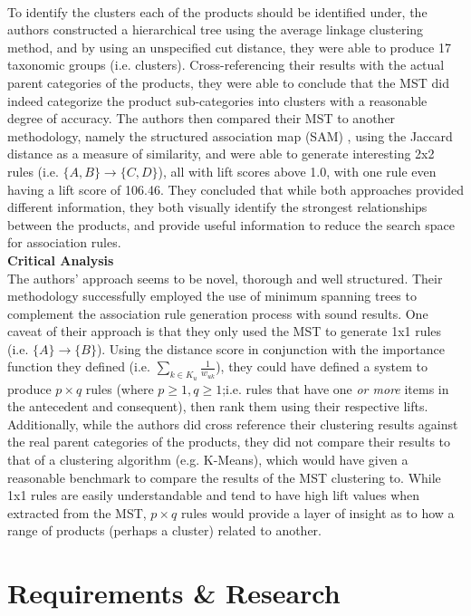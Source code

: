 \documentclass[a4paper,11pt]{article}
\newcommand{\setA}{\{A\}}
\newcommand{\setB}{\{B\}}
\newcommand{\abrule}{\setA\rightarrow\setB}
\begin{document}
\\
To identify the clusters each of the products should be identified under, the authors constructed a hierarchical tree using the average linkage clustering method, and by using an unspecified cut distance, they were able to produce 17 taxonomic groups (i.e. clusters). Cross-referencing their results with the actual parent categories of the products, they were able to conclude that the MST did indeed categorize the product sub-categories into clusters with a reasonable degree of accuracy. The authors then compared their MST to another methodology, namely the structured association map (SAM) \cite{kim}, using the Jaccard distance as a measure of similarity,  and were able to generate interesting 2x2 rules (i.e. $\{A,B\}\rightarrow\{C, D\}$), all with lift scores above 1.0, with one rule even having a lift score of 106.46. They concluded that while both approaches provided different information, they both visually identify the strongest relationships between the products, and provide useful information to reduce the search space for association rules.
\\\textbf{Critical Analysis}\\
The authors' approach seems to be novel,  thorough and well structured.  Their methodology successfully employed the use of minimum spanning trees to complement the association rule generation process with sound results.  One caveat of their approach is that they only used the MST to generate 1x1 rules (i.e. $\abrule$). Using the distance score in conjunction with the importance function they defined (i.e. $\sum\limits_{k \in K_u}^{} \frac{1}{w_{uk}}$), they could have defined a system to produce $p \times q$ rules (where $ p \geq 1, q \geq 1$;i.e. rules that have one \textit{or more} items in the antecedent and consequent), then rank them using their respective lifts.  Additionally, while the authors did cross reference their clustering results against the real parent categories of the products, they did not compare their results to that of a clustering algorithm (e.g. K-Means), which would have given a reasonable benchmark to compare the results of the MST clustering to. While 1x1 rules are easily understandable and tend to have high lift values when extracted from the MST, $p \times q$ rules would provide a layer of insight as to how a range of products (perhaps a cluster) related to another.

\newpage
\section{Requirements \& Research}
\end{document}
